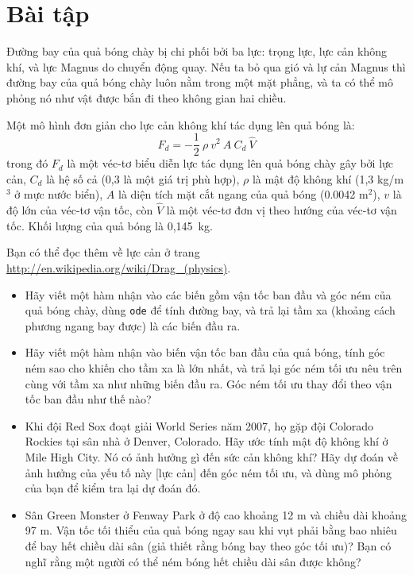 \documentclass[12pt]{book}
\begin{document}
\section{Bài tập}

\begin{ex}
\label{baseball}

Đường bay của quả bóng chày bị chi phối bởi ba lực: trọng lực,
lực cản không khí, và lực Magnus do chuyển động quay. Nếu ta
bỏ qua gió và lự cản Magnus thì đường bay của quả bóng chày
luôn nằm trong một mặt phẳng, và ta có thể mô phỏng nó như
vật được bắn đi theo không gian hai chiều.

Một mô hình đơn giản cho lực cản không khí tác dụng lên quả bóng là:
%
\[ F_d = -\frac{1}{2} ~ \rho ~ v^2 ~ A ~ C_d ~ \hat{V}   \]
%
trong đó $F_d$ là một véc-tơ biểu diễn lực tác dụng lên quả bóng 
chày gây bởi lực cản, $C_d$ là hệ số cả (0,3 là một giá trị phù hợp),
$\rho$ là mật độ không khí (1,3 kg/m$^3$ ở mực nước biển), $A$
là diện tích mặt cắt ngang của quả bóng (0.0042 m$^2$), $v$ là
độ lớn của véc-tơ vận tốc, còn $\hat{V}$ là một véc-tơ đơn vị
theo hướng của véc-tơ vận tốc. Khối lượng của quả bóng là 
0,145~kg.

Bạn có thể đọc thêm về lực cản ở trang 
\url{http://en.wikipedia.org/wiki/Drag_(physics)}.

\begin{itemize}

\item Hãy viết một hàm nhận vào các biến gồm vận tốc ban đầu và góc ném của
quả bóng chày, dùng {\tt ode} để tính đường bay, và trả lại tầm xa (khoảng
cách phương ngang bay được) là các biến đầu ra.

\item Hãy viết một hàm nhận vào biến vận tốc ban đầu của quả bóng, tính
góc ném sao cho khiến cho tầm xa là lớn nhất, và trả lại góc ném tối ưu nêu
trên cùng với tầm xa như những biến đầu ra. Góc ném tối ưu thay đổi theo
vận tốc ban đầu như thế nào?

\item Khi đội Red Sox đoạt giải World Series năm 2007, họ gặp đội
Colorado Rockies tại sân nhà ở Denver, Colorado.  Hãy ước tính mật độ
không khí ở Mile High City. Nó có ảnh hưởng gì đến sức cản không khí?
Hãy dự đoán về ảnh hưởng của yếu tố này [lực cản] đến góc ném tối ưu,
và dùng mô phỏng của bạn để kiểm tra lại dự đoán đó.

\item Sân Green Monster ở Fenway Park ở độ cao khoảng 12 m và 
chiều dài khoảng 97 m. Vận tốc tối thiểu của quả bóng ngay sau khi
vụt phải bằng bao nhiêu để bay hết chiều dài sân (giả thiết rằng 
bóng bay theo góc tối ưu)? Bạn có nghĩ rằng một người có thể
ném bóng hết chiều dài sân được không?


\end{itemize}
\end{ex}
\end{document}
